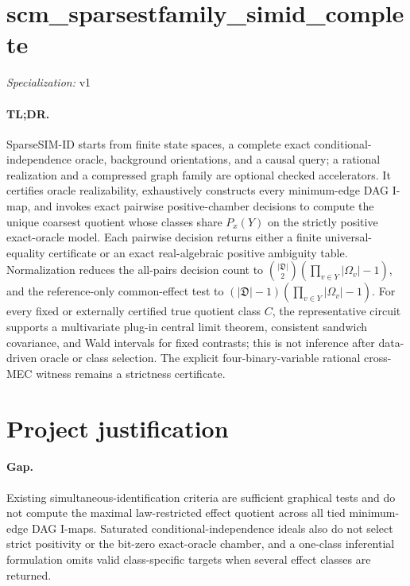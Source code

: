 \documentclass{article}
\begin{document}
\sloppy

\section*{scm\_\allowbreak{}sparsestfamily\_\allowbreak{}simid\_\allowbreak{}complete}

\noindent\textit{Specialization:} v1\par

\paragraph{TL;DR.} SparseSIM-ID starts from finite state spaces, a complete exact conditional-independence oracle, background orientations, and a causal query; a rational realization and a compressed graph family are optional checked accelerators. It certifies oracle realizability, exhaustively constructs every minimum-edge DAG I-map, and invokes exact pairwise positive-chamber decisions to compute the unique coarsest quotient whose classes share \(P_x(Y)\) on the strictly positive exact-oracle model. Each pairwise decision returns either a finite universal-equality certificate or an exact real-algebraic positive ambiguity table. Normalization reduces the all-pairs decision count to \(\binom{|\mathfrak D|}{2}(\prod_{v\in Y}|\Omega_v|-1)\), and the reference-only common-effect test to \((|\mathfrak D|-1)(\prod_{v\in Y}|\Omega_v|-1)\). For every fixed or externally certified true quotient class \(C\), the representative circuit supports a multivariate plug-in central limit theorem, consistent sandwich covariance, and Wald intervals for fixed contrasts; this is not inference after data-driven oracle or class selection. The explicit four-binary-variable rational cross-MEC witness remains a strictness certificate.

\section{Project justification}

\paragraph{Gap.} Existing simultaneous-identification criteria are sufficient graphical tests and do not compute the maximal law-restricted effect quotient across all tied minimum-edge DAG I-maps. Saturated conditional-independence ideals also do not select strict positivity or the bit-zero exact-oracle chamber, and a one-class inferential formulation omits valid class-specific targets when several effect classes are returned.
\end{document}
